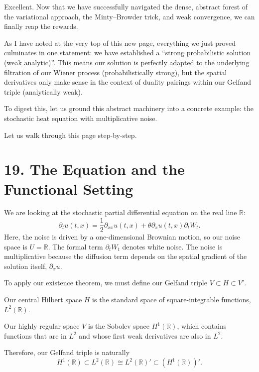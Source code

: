 \documentclass[11pt]{article}
\theoremstyle{definition}
\theoremstyle{remark}
\begin{document}
Excellent. Now that we have successfully navigated the dense, abstract forest of the variational approach, the Minty--Browder trick, and weak convergence, we can finally reap the rewards.

As I have noted at the very top of this new page, everything we just proved culminates in one statement: we have established a ``strong probabilistic solution (weak analytic)''. This means our solution is perfectly adapted to the underlying filtration of our Wiener process (probabilistically strong), but the spatial derivatives only make sense in the context of duality pairings within our Gelfand triple (analytically weak).

To digest this, let us ground this abstract machinery into a concrete example: the stochastic heat equation with multiplicative noise.

Let us walk through this page step-by-step.

\section*{19. The Equation and the Functional Setting}
We are looking at the stochastic partial differential equation on the real line $\mathbb{R}$:
\[
\partial_t u(t,x)=\frac{1}{2}\partial_{xx}u(t,x)+\theta\partial_x u(t,x)\partial_t W_t.
\]
Here, the noise is driven by a one-dimensional Brownian motion, so our noise space is $U=\mathbb{R}$. The formal term $\partial_t W_t$ denotes white noise. The noise is multiplicative because the diffusion term depends on the spatial gradient of the solution itself, $\partial_x u$.

To apply our existence theorem, we must define our Gelfand triple $V\subset H\subset V'$.

Our central Hilbert space $H$ is the standard space of square-integrable functions, $L^2(\mathbb{R})$.

Our highly regular space $V$ is the Sobolev space $H^1(\mathbb{R})$, which contains functions that are in $L^2$ and whose first weak derivatives are also in $L^2$.

Therefore, our Gelfand triple is naturally
\[
H^1(\mathbb{R})\subset L^2(\mathbb{R})\cong L^2(\mathbb{R})'\subset (H^1(\mathbb{R}))'.
\]
\end{document}
